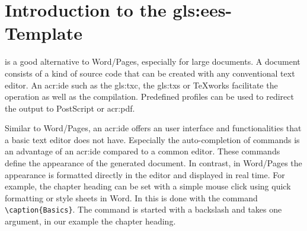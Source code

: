 
\chapter{Introduction to the \gls*{gls:ees}-\Latex Template}
\label{chap:introduction}
\Latex is a good alternative to Word/Pages, especially for large documents. A \Latex document consists of a kind of source code that can be created with any conventional text editor. An \ac{acr:ide} such as the \gls{gls:txc}, the \gls{gls:txs} or TeXworks facilitate the operation as well as the compilation. Predefined profiles can be used to redirect the output to PostScript or \ac{acr:pdf}. 

Similar to Word/Pages, an \ac{acr:ide} offers an user interface and functionalities that a basic text editor does not have. Especially the auto-completion of \Latex commands is an advantage of an \ac{acr:ide} compared to a common editor. These commands define the appearance of the generated document. In contrast, in Word/Pages the appearance is formatted directly in the editor and displayed in real time. For example, the chapter heading can be set with a simple mouse click using quick formatting or style sheets in Word. In \Latex this is done with the command \lstinline|\caption{Basics}|. The command is started with a backslash and takes one argument, in our example the chapter heading.

